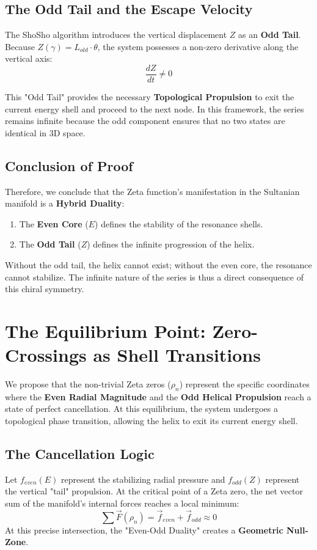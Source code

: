 \documentclass[11pt,a4paper]{article}
\begin{document}
\subsection{The Odd Tail and the Escape Velocity}
The ShoSho algorithm introduces the vertical displacement $Z$ as an \textbf{Odd Tail}. Because $Z(\gamma) = L_{old} \cdot \theta$, the system possesses a non-zero derivative along the vertical axis:
\begin{equation}
    \frac{dZ}{dt} \neq 0
\end{equation}

This "Odd Tail" provides the necessary \textbf{Topological Propulsion} to exit the current energy shell and proceed to the next node. In this framework, the series remains infinite because the odd component ensures that no two states are identical in 3D space. 

\subsection{Conclusion of Proof}
Therefore, we conclude that the Zeta function's manifestation in the Sultanian manifold is a \textbf{Hybrid Duality}: 
\begin{enumerate}
    \item The \textbf{Even Core} ($E$) defines the stability of the resonance shells.
    \item The \textbf{Odd Tail} ($Z$) defines the infinite progression of the helix.
\end{enumerate}
Without the odd tail, the helix cannot exist; without the even core, the resonance cannot stabilize. The infinite nature of the series is thus a direct consequence of this chiral symmetry.

\section{The Equilibrium Point: Zero-Crossings as Shell Transitions}

We propose that the non-trivial Zeta zeros ($\rho_n$) represent the specific coordinates where the \textbf{Even Radial Magnitude} and the \textbf{Odd Helical Propulsion} reach a state of perfect cancellation. At this equilibrium, the system undergoes a topological phase transition, allowing the helix to exit its current energy shell.

\subsection{The Cancellation Logic}
Let $f_{even}(E)$ represent the stabilizing radial pressure and $f_{odd}(Z)$ represent the vertical "tail" propulsion. At the critical point of a Zeta zero, the net vector sum of the manifold's internal forces reaches a local minimum:
\begin{equation}
    \sum \vec{F}(\rho_n) = \vec{f}_{even} + \vec{f}_{odd} \approx 0
\end{equation}
At this precise intersection, the "Even-Odd Duality" creates a \textbf{Geometric Null-Zone}. 
\end{document}
